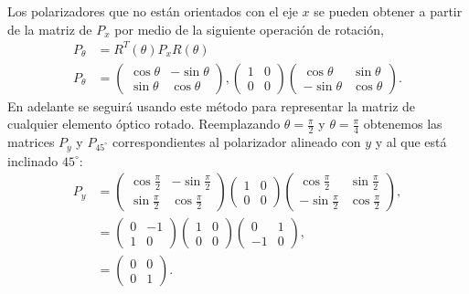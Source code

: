 Los polarizadores que no están orientados con el eje $x$ se pueden
obtener a partir de la matriz de $P_x$ por medio de la siguiente
operación de rotación, 
\begin{align*}
P_{\theta}&=R^T(\theta)P_xR(\theta)\\
P_{\theta}
&=
\begin{pmatrix}
  \cos{\theta} &-\sin{\theta}\\\sin{\theta}&\cos{\theta}
\end{pmatrix},
\begin{pmatrix}
1 & 0 \\0& 0
\end{pmatrix}
\begin{pmatrix}
  \cos{\theta} &\sin{\theta}\\-\sin{\theta}&\cos{\theta}
\end{pmatrix}.
\end{align*}
En adelante se seguirá usando este método para representar la matriz de cualquier
elemento óptico rotado.
Reemplazando $\theta = \frac{\pi}{2}$ y $\theta = \frac{\pi}{4}$
obtenemos las matrices $P_y$ y $P_{45^{\circ}}$ correspondientes al
polarizador alineado con $y$ y al que está inclinado $45^{\circ}$:
\begin{align*}
P_{y}
&=
\begin{pmatrix}
  \cos{\frac{\pi}{2}} &-\sin{\frac{\pi}{2}}\\\sin{\frac{\pi}{2}}&\cos{\frac{\pi}{2}}
\end{pmatrix}
\begin{pmatrix}
1 & 0 \\0& 0
\end{pmatrix}
\begin{pmatrix}
  \cos{\frac{\pi}{2}} &\sin{\frac{\pi}{2}}\\-\sin{\frac{\pi}{2}}&\cos{\frac{\pi}{2}}
\end{pmatrix},\\
&=
\begin{pmatrix}
  0&-1\\1&0
\end{pmatrix}
\begin{pmatrix}
1 & 0 \\0& 0
\end{pmatrix}
\begin{pmatrix}
0 &1\\-1&0
\end{pmatrix},\\
&=
\begin{pmatrix}
0 &0\\0&1
\end{pmatrix}.\\
\end{align*}
